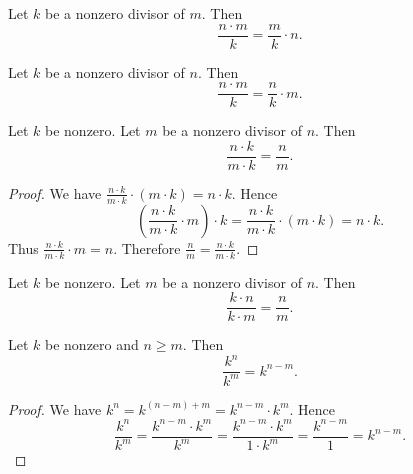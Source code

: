\documentclass[../../arithmetic.ftl.tex]{subfiles}
\begin{document}
\begin{forthel}
    \begin{corollary}\label{Arithmetic_03_05_173047}
      Let $k$ be a nonzero divisor of $m$.
      Then \[ \frac{n \cdot m}{k} = \frac{m}{k} \cdot n. \]
    \end{corollary}

    \begin{corollary}\label{Arithmetic_03_05_401748}
      Let $k$ be a nonzero divisor of $n$.
      Then \[ \frac{n \cdot m}{k} = \frac{n}{k} \cdot m. \]
    \end{corollary}

    \begin{proposition}\label{Arithmetic_03_05_243924}
      Let $k$ be nonzero.
      Let $m$ be a nonzero divisor of $n$.
      Then \[ \frac{n \cdot k}{m \cdot k} = \frac{n}{m}. \]
    \end{proposition}
    \begin{proof}
      We have $\frac{n \cdot k}{m \cdot k} \cdot (m \cdot k) = n \cdot k$.
      Hence
      \[  \left( \frac{n \cdot k}{m \cdot k} \cdot m \right) \cdot k
          = \frac{n \cdot k}{m \cdot k} \cdot (m \cdot k)
          = n \cdot k. \]
      Thus $\frac{n \cdot k}{m \cdot k} \cdot m = n$.
      Therefore $\frac{n}{m} = \frac{n \cdot k}{m \cdot k}$.
    \end{proof}

    \begin{corollary}\label{Arithmetic_03_05_424330}
      Let $k$ be nonzero.
      Let $m$ be a nonzero divisor of $n$.
      Then \[ \frac{k \cdot n}{k \cdot m} = \frac{n}{m}. \]
    \end{corollary}

    \begin{proposition}\label{Arithmetic_03_05_469833}
      Let $k$ be nonzero and $n \geq m$.
      Then \[ \frac{k^{n}}{k^{m}} = k^{n - m}. \]
    \end{proposition}
    \begin{proof}
      We have $k^{n} = k^{(n - m) + m} = k^{n - m} \cdot k^{m}$.
      Hence
      \[  \frac{k^{n}}{k^{m}}
          = \frac{k^{n - m} \cdot k^{m}}{k^{m}}
          = \frac{k^{n - m} \cdot k^{m}}{1 \cdot k^{m}}
          = \frac{k^{n - m}}{1}
          = k^{n - m}. \]
    \end{proof}
  \end{forthel}
\end{document}
